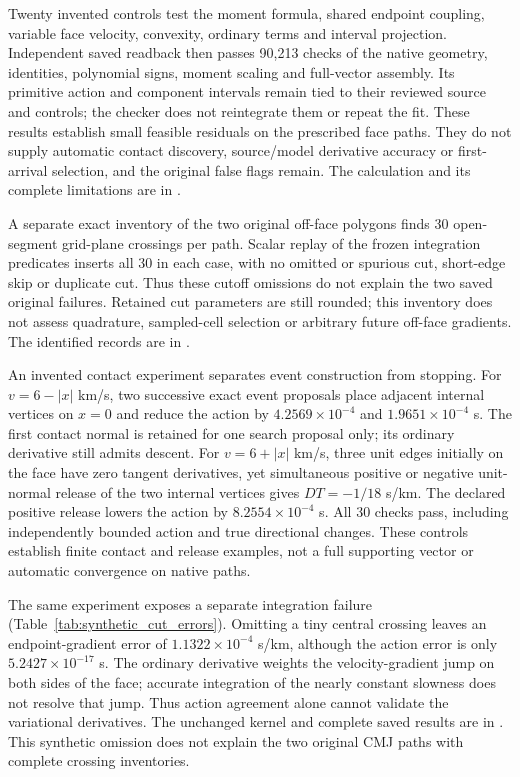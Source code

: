Twenty invented controls test the moment formula, shared endpoint coupling,
variable face velocity, convexity, ordinary terms and interval projection.
Independent saved readback then passes 90,213 checks of the native geometry,
identities, polynomial signs, moment scaling and full-vector assembly. Its
primitive action and component intervals remain tied to their reviewed source
and controls; the checker does not reintegrate them or repeat the fit.
These results establish small feasible residuals on the prescribed face paths.
They do not supply automatic contact discovery, source/model derivative
accuracy or first-arrival selection, and the original false flags remain.
The calculation and its complete limitations are in
.

A separate exact inventory of the two original off-face polygons finds
30 open-segment grid-plane crossings per path. Scalar replay of the frozen
integration predicates inserts all 30 in each case, with no omitted or
spurious cut, short-edge skip or duplicate cut. Thus these cutoff omissions
do not explain the two saved original failures. Retained cut parameters are
still rounded; this inventory does not assess quadrature, sampled-cell
selection or arbitrary future off-face gradients. The identified records are
in .

An invented contact experiment separates event construction from stopping.
For $v=6-|x|$ km/s, two successive exact event proposals place adjacent
internal vertices on $x=0$ and reduce the action by $4.2569\times10^{-4}$
and $1.9651\times10^{-4}$ s. The first contact normal is retained for one
search proposal only; its ordinary derivative still admits descent.
For $v=6+|x|$ km/s, three unit edges initially on the face have zero tangent
derivatives, yet simultaneous positive or negative unit-normal release of
the two internal vertices gives $D T=-1/18$ s/km. The declared positive
release lowers the action by $8.2554\times10^{-4}$ s. All 30 checks pass,
including independently bounded action and true directional changes.
These controls establish finite contact and release examples, not a full
supporting vector or automatic convergence on native paths.

The same experiment exposes a separate integration failure
(Table~\ref{tab:synthetic_cut_errors}). Omitting a tiny central crossing
leaves an endpoint-gradient error of $1.1322\times10^{-4}$ s/km, although
the action error is only $5.2427\times10^{-17}$ s. The ordinary derivative
weights the velocity-gradient jump on both sides of the face; accurate
integration of the nearly constant slowness does not resolve that jump.
Thus action agreement alone cannot validate the variational derivatives.
The unchanged kernel and complete saved results are in
.
This synthetic omission does not explain the two original CMJ paths with
complete crossing inventories.

